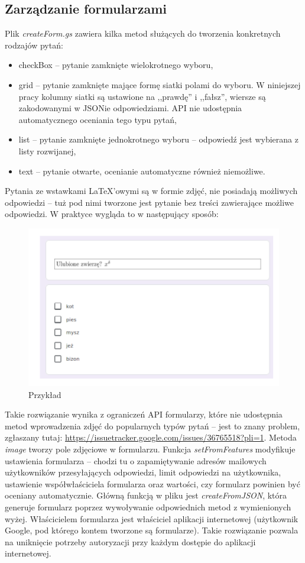 \subsection{Zarządzanie formularzami}
Plik \textit{createForm.gs} zawiera kilka metod służących do tworzenia konkretnych rodzajów pytań:
\begin{itemize}
\item checkBox -- pytanie zamknięte wielokrotnego wyboru,
\item grid -- pytanie zamknięte mające formę siatki polami do wyboru. W niniejszej pracy kolumny siatki są ustawione na ,,prawdę'' i ,,fałsz'', wiersze są zakodowanymi w JSONie odpowiedziami. API nie udostępnia automatycznego oceniania tego typu pytań,
\item list -- pytanie zamknięte jednokrotnego wyboru -- odpowiedź jest wybierana z listy rozwijanej,
\item text -- pytanie otwarte, ocenianie automatyczne również niemożliwe.

\end{itemize}
Pytania ze wstawkami \LaTeX{}'owymi są w formie zdjęć, nie posiadają możliwych odpowiedzi -- tuż pod nimi tworzone jest pytanie bez treści zawierające możliwe odpowiedzi. W praktyce wygląda to w następujący sposób:
\begin{figure}[H]
  \includegraphics[scale=0.75]{przyklad.png}
  \caption{Przykład}
  \label{fig:1}
\end{figure}
Takie rozwiązanie wynika z ograniczeń  API formularzy, które nie udostępnia metod wprowadzenia zdjęć do popularnych typów pytań -- jest to znany problem, zgłaszany tutaj: \href{https://issuetracker.google.com/issues/36765518?pli=1}{https://issuetracker.google.com/issues/36765518?pli=1}. Metoda \textit{image} tworzy pole zdjęciowe w formularzu. 
Funkcja \textit{setFromFeatures} modyfikuje ustawienia formularza -- chodzi tu o zapamiętywanie adresów mailowych użytkowników przesyłających odpowiedzi, limit odpowiedzi na użytkownika, ustawienie współwłaściciela formularza oraz wartości, czy formularz powinien być oceniany automatycznie.
\ind Główną funkcją w pliku jest \textit{createFromJSON}, która generuje formularz poprzez wywoływanie odpowiednich metod z wymienionych wyżej. Właścicielem formularza jest właściciel aplikacji internetowej (użytkownik Google, pod którego  kontem tworzone są formularze). Takie rozwiązanie pozwala na uniknięcie potrzeby autoryzacji przy każdym dostępie do aplikacji internetowej.

